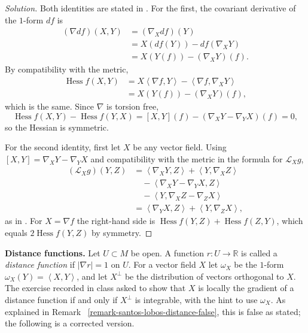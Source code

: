 \begin{proof}[Solution]
Both identities are stated in
\cite[Section 2.1, (2.25)]%
{gomes2015operadores}. For the first, the
covariant derivative of the $1$-form $df$ is
$$
\begin{aligned}
(\nabla df)(X,Y)
&= (\nabla_X df)(Y) \\
&= X(df(Y)) - df(\nabla_X Y) \\
&= X(Y(f)) - (\nabla_X Y)(f).
\end{aligned}
$$
By compatibility with the metric,
$$
\begin{aligned}
\operatorname{Hess} f(X,Y)
&= X\left\langle{} \nabla f, Y
\right\rangle{}
- \left\langle{} \nabla f, \nabla_X Y
\right\rangle{} \\
&= X(Y(f)) - (\nabla_X Y)(f),
\end{aligned}
$$
which is the same. Since $\nabla$ is torsion
free,
$$
\operatorname{Hess} f(X,Y)
- \operatorname{Hess} f(Y,X)
= [X,Y](f) - (\nabla_X Y - \nabla_Y X)(f)
= 0,
$$
so the Hessian is symmetric.

For the second identity, first let $X$ be
any vector field. Using
$[X,Y] = \nabla_X Y - \nabla_Y X$ and
compatibility with the metric in the
formula for $\mathcal{L}_X g$,
$$
\begin{aligned}
(\mathcal{L}_X g)(Y,Z)
&= \left\langle{} \nabla_X Y, Z
\right\rangle{}
+ \left\langle{} Y, \nabla_X Z
\right\rangle{} \\
&\quad - \left\langle{} \nabla_X Y
- \nabla_Y X, Z \right\rangle{} \\
&\quad - \left\langle{} Y, \nabla_X Z
- \nabla_Z X \right\rangle{} \\
&= \left\langle{} \nabla_Y X, Z
\right\rangle{}
+ \left\langle{} Y, \nabla_Z X
\right\rangle{},
\end{aligned}
$$
as in \cite[(2.10)]{gomes2015operadores}.
For $X = \nabla f$ the right-hand side is
$\operatorname{Hess} f(Y,Z) +
\operatorname{Hess} f(Z,Y)$, which equals
$2\operatorname{Hess} f(Y,Z)$ by symmetry.
\end{proof}

\medskip\noindent
{\bf Distance functions.}
Let $U \subset M$ be open. A function
$r : U \to \mathbb{R}$ is called a
\emph{distance function} if
$|\nabla r| = 1$ on $U$. For a vector field
$X$ let $\omega_X$ be the $1$-form
$\omega_X(Y) = \left\langle{} X,Y
\right\rangle{}$, and let $X^\perp$ be the
distribution of vectors orthogonal to $X$.
The exercise recorded in class asked to
show that $X$ is locally the gradient of a
distance function if and only if $X^\perp$
is integrable, with the hint to use
$\omega_X$. As explained in
Remark~%
\ref{remark-santos-lobos-distance-false},
this is false as stated; the following is
a corrected version.

